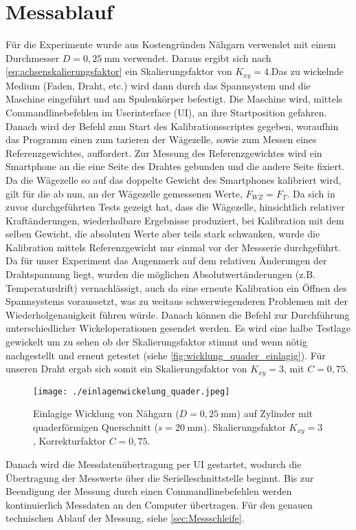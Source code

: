 \section{Messablauf}
\label{sec:Messablauf}


Für die Experimente wurde aus Kostengründen Nähgarn verwendet mit einem Durchmesser $D = 0,25~\si{\milli\metre}$ verwendet. Daraus ergibt sich nach \autoref{eq:achsenskalierungsfaktor} ein Skalierungsfaktor von $K_{xy} = 4$.Das zu wickelnde Medium (Faden, Draht, etc.) wird dann durch das Spannsystem und die Maschine eingeführt und am Spulenkörper befestigt. Die Maschine wird, mittels Commandlinebefehlen im Userinterface (UI), an ihre Startposition gefahren. Danach wird der Befehl zum Start des Kalibrationsscriptes gegeben, woraufhin das Programm einen zum tarieren der Wägezelle, sowie zum Messen eines Referenzgewichtes, auffordert. Zur Messung des Referenzgewichtes wird ein Smartphone an die eine Seite des Drahtes gebunden und die andere Seite fixiert. Da die Wägezelle so auf das doppelte Gewicht des Smartphones kalibriert wird, gilt für die ab nun, an der Wägezelle gemessenen Werte, $F_{WZ} = F_T$. Da sich in zuvor durchgeführten Tests gezeigt hat, dass die Wägezelle, hinsichtlich relativer Kraftänderungen, wiederholbare Ergebnisse produziert, bei Kalibration mit dem selben Gewicht, die absoluten Werte aber teils stark schwanken, wurde die Kalibration mittels Referenzgewicht nur einmal vor der Messserie durchgeführt. Da für unser Experiment das Augenmerk auf dem relativen Änderungen der Drahtspannung liegt, wurden die möglichen Absolutwertänderungen (z.B. Temperaturdrift) vernachlässigt, auch da eine erneute Kalibration ein Öffnen des Spannsystems voraussetzt, was zu weitaus schwerwiegenderen Problemen mit der Wiederholgenauigkeit führen würde.
Danach können die Befehl zur Durchführung unterschiedlicher Wickeloperationen gesendet werden. Es wird eine halbe Testlage gewickelt um zu sehen ob der Skalierungsfaktor stimmt und wenn nötig nachgestellt und erneut getestet (siehe \autoref{fig:wicklung_quader_einlagig}). Für unseren Draht ergab sich somit ein Skalierungsfaktor von $K_{xy} = 3$, mit $C = 0,75$. 
\begin{figure}[H]
    \centering
    \texttt{[image: ./einlagenwickelung\_quader.jpeg]}
    \caption{Einlagige Wicklung von Nähgarn ($D = 0,25~\si{\milli\metre}$) auf Zylinder mit quaderförmigen Querschnitt ($s=20~\si{\milli\metre}$). Skalierungsfaktor $K_{xy} = 3$, Korrekturfaktor $C = 0,75$.}
    \label{fig:wicklung_quader_einlagig}
\end{figure}
Danach wird die  Messdatenübertragung per UI gestartet, wodurch die Übertragung der Messwerte über die Serielleschnittstelle beginnt. Bis zur Beendigung der Messung durch einen Commandlinebefehlen werden kontinuierlich Messdaten an den Computer übertragen. Für den genauen technischen Ablauf der Messung, siehe \autoref{sec:Messschleife}. 



